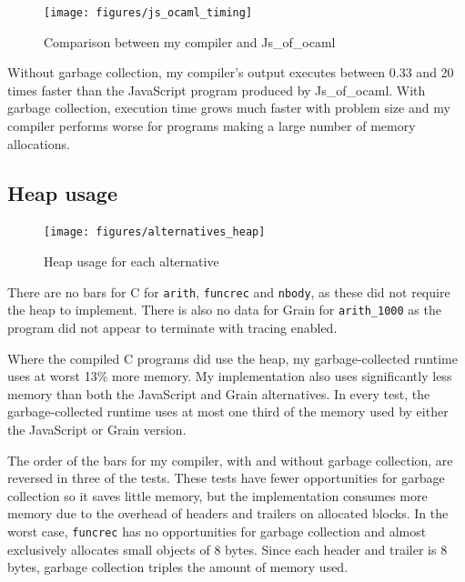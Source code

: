 \begin{figure}[H]
\hspace{-1.6cm}
\texttt{[image: figures/js\_ocaml\_timing]}
\vspace{-0.5cm}
\caption{Comparison between my compiler and Js\_of\_ocaml}
 \label{fig:js_oc_timing} 
\end{figure}

Without garbage collection, my compiler's output	executes between 0.33 and 20 times faster than the JavaScript program produced by  Js\_of\_ocaml. With garbage collection, execution time grows much faster with problem size and my compiler performs worse for programs making a large number of memory allocations.



\subsection{Heap usage}

\begin{figure}[H]
\hspace{-1cm}
\texttt{[image: figures/alternatives\_heap]}
\vspace{-0.5cm}
\caption{Heap usage for each alternative}
 \label{fig:alt_heap} 
\end{figure}

There are no bars for C for \verb|arith|, \verb|funcrec| and \verb|nbody|, as these did not require the heap to implement. 
There is also no data for Grain for \verb|arith_1000| as the program did not appear to terminate with tracing enabled.

Where the compiled C programs did use the heap, my garbage-collected runtime uses at worst 13\% more memory. My implementation also uses significantly less memory than both the JavaScript and Grain alternatives. In every test, %
the garbage-collected runtime uses at most one third of the memory used by either the JavaScript or Grain version. 

The order of the bars for my compiler, with and without garbage collection, are reversed in three of the tests. These tests have fewer opportunities for garbage collection so it saves little memory, but the implementation consumes more memory due to the overhead of headers and trailers on allocated blocks. In the worst case, \verb|funcrec| has no opportunities for garbage collection and almost exclusively allocates small objects of 8 bytes. Since each header and trailer is 8 bytes, garbage collection triples the amount of memory used.




